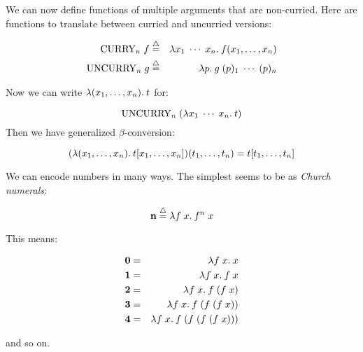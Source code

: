 \begin{slide*}


\vspace*{0.5cm}

We can now define functions of multiple arguments that are non-curried. Here
are functions to translate between curried and uncurried versions:

\begin{red}
\begin{eqnarray*}
\mbox{CURRY}_n\; f  & \stackrel{\bigtriangleup}{=} & \lambda x_1\; \cdots \; x_n.\: f(x_1,\ldots,x_n) \\
\mbox{UNCURRY}_n\;g & \stackrel{\bigtriangleup}{=} & \lambda p.\: g\; (p)_1 \; \cdots \; (p)_n
\end{eqnarray*}
\end{red}
Now we can write {\red $\lambda (x_1,\ldots,x_n).\: t$} for:

{\red $$\mbox{UNCURRY}_n\; (\lambda x_1\; \cdots \; x_n.\: t)$$}
Then we have generalized $\beta$-conversion:

{\red $$(\lambda (x_1,\ldots,x_n).\: t[x_1,\ldots,x_n]) (t_1,\ldots,t_n) =
              t[t_1,\ldots,t_n]$$}

\end{slide*}



\begin{slide*}


\vspace*{0.5cm}

We can encode numbers in many ways. The simplest seems to be as {\em Church
numerals}:

{\red $$ {\bf n} \stackrel{\bigtriangleup}{=} \lambda f\; x.\: f^n\; x $$}

This means:

\begin{red}
\begin{eqnarray*}
{\bf 0} & = & \lambda f\; x.\: x                    \\
{\bf 1} & = & \lambda f\; x.\: f\; x                \\
{\bf 2} & = & \lambda f\; x.\: f\;(f\; x)           \\
{\bf 3} & = & \lambda f\; x.\: f\;(f\; (f\; x))     \\
{\bf 4} & = & \lambda f\; x.\: f\;(f\; (f\; (f\; x)))
\end{eqnarray*}
\end{red}
and so on.

\end{slide*}


